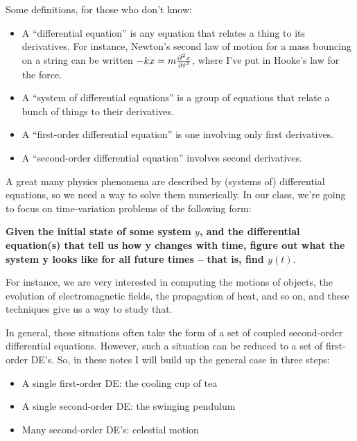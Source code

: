 \documentclass[12ampt]{article}
\def\PARTWO#1#2{ {{\partial^2 #1}\over{\partial #2}^2} }
\begin{document}
\Large
\centerline{}
\normalsize

Some definitions, for those who don't know:

\begin{itemize}
\item A ``differential equation'' is any equation that relates a thing to its 
derivatives. For instance, Newton's second law of motion for a mass bouncing
on a string can be written
$-kx = m \PARTWO{x}{t}$, where I've put in Hooke's law for the force.

\item A ``system of differential equations'' is a group of equations 
that relate a bunch of things to their derivatives.

\item A ``first-order differential equation'' is one involving only first derivatives.

\item A ``second-order differential equation'' involves second derivatives.

\end{itemize}

A great many physics phenomena are described by (systems of) differential equations, so we need a way to solve them numerically. In our class, we're going to focus on time-variation problems of the following form:

{\bf Given the initial state of some system $y$, and the differential equation(s) that tell us how y changes with time, figure out what the system y looks like for all future times -- that is, find $y(t)$}.

For instance, we are very interested in computing the motions of objects, 
the evolution of electromagnetic fields, 
the propagation of heat, and so on, 
and these techniques give us a way to study that.

In general, these situations often take the form of a set of coupled second-order differential equations. 
However, such a situation can be reduced to a set of 
first-order DE's. So, in these notes I will build up the general case in three steps:

\begin{itemize}
  \item{A single first-order DE: the cooling cup of tea}
  \item{A single second-order DE: the swinging pendulum} 
  \item{Many second-order DE's: celestial motion}
\end{itemize}
\end{document}

